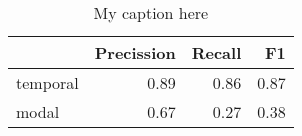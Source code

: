 \begin{table}[!ht]
\centering
\begin{tabular}{lrrr}
\toprule
{} &  Precission &  Recall &   F1 \\
\midrule
temporal &        0.89 &    0.86 & 0.87 \\
modal    &        0.67 &    0.27 & 0.38 \\
\bottomrule
\end{tabular}
\caption{My caption here}
\label{tab:DEICTICITY-ocd-combined-F1}
\end{table}
